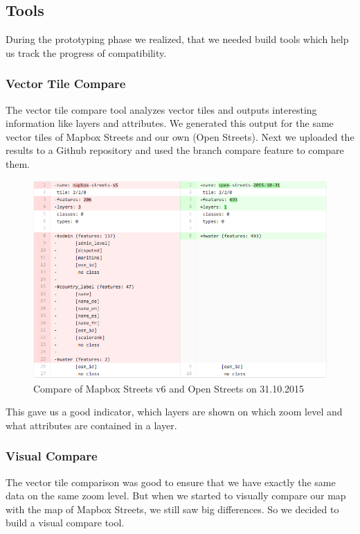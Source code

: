 \subsection{Tools}\label{tools}
During the prototyping phase we realized, that we needed build tools which help us track the progress of compatibility.

\subsubsection{Vector Tile Compare}\label{vector_tile_compare}
The vector tile compare tool analyzes vector tiles and outputs interesting information like layers and attributes. We generated this output for the same vector tiles of Mapbox Streets and our own (Open Streets). Next we uploaded the results to a Github repository and used the branch compare feature to compare them. 

\begin{figure}[H]
  \centering
  \includegraphics[width=1\textwidth]{images/vector_tile_compare.png}
  \caption{Compare of Mapbox Streets v6 and Open Streets on 31.10.2015}
\end{figure}

This gave us a good indicator, which layers are shown on which zoom level and what attributes are contained in a layer.
\subsubsection{Visual Compare}\label{visual_compare}
The vector tile comparison was good to ensure that we have exactly the same data on the same zoom level. But when we started to visually compare our map with the map of Mapbox Streets, we still saw big differences. So we decided to build a visual compare tool. 

